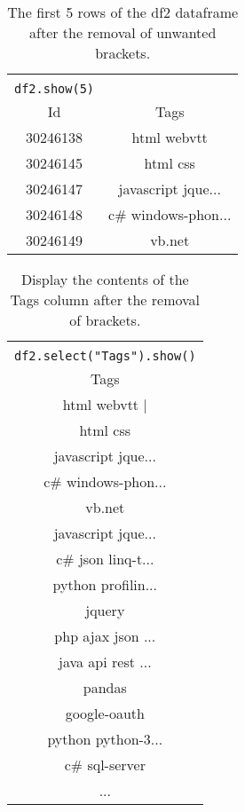 \documentclass[]{article}
\newcommand{\code}[1]{\colorbox{light-gray}{\texttt{#1}}}
\begin{document}
\begin{table}[!ht]
	\begin{center}
		\caption{The first 5 rows of the df2 dataframe after the removal of unwanted brackets.}
		\label{tab:table1}
		\begin{tabular}{|cc|} 
			\hline
			&\\
			\code{df2.show(5)}&\\
			\hline
			Id & Tags \\
			\hline
			30246138&html webvtt\\
			30246145& html css\\
			30246147&javascript jque...\\
			30246148&c\# windows-phon...\\
			30246149& vb.net\\
			
			\hline
		\end{tabular}
	\end{center}
\end{table}

\begin{table}[!ht]
	\begin{center}
		\caption{Display the contents of the Tags column after the removal of brackets.}
		\label{tab:table1}
		\begin{tabular}{|c|} 
			\hline
			\\
			\code{df2.select("Tags").show()}\\
			\hline
			Tags \\
			\hline
			html  webvtt |\\
			html  css\\
			javascript  jque...\\
			c\#  windows-phon...\\
			vb.net \\
			javascript  jque...\\
			c\#  json  linq-t...\\
			python  profilin...\\
			jquery \\
			php  ajax  json ...\\
			java  api  rest ...\\
			pandas \\
			google-oauth \\
			python  python-3...\\
			c\#  sql-server \\
			...\\
			
			\hline
		\end{tabular}
	\end{center}
\end{table}
\end{document}
